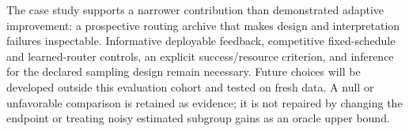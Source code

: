 The case study supports a narrower contribution than demonstrated adaptive improvement: a prospective routing
archive that makes design and interpretation failures inspectable. Informative deployable feedback, competitive
fixed-schedule and learned-router controls, an explicit success/resource criterion, and inference for the declared
sampling design remain necessary. Future choices will be developed outside this evaluation cohort and tested
on fresh data. A null or unfavorable comparison is retained as evidence; it is not repaired by changing the
endpoint or treating noisy estimated subgroup gains as an oracle upper bound.

